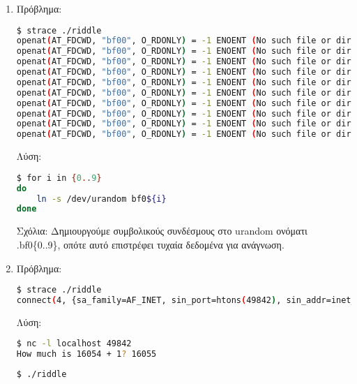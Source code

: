 \documentclass[12pt,titlepage]{article}
\newcommand{\en}{\textlatin}
\begin{document}
\begin{enumerate}
Σχόλια: Δημιουργούμε ένα σύνδεσμο στο αρχείο \en{.hello_there} ονόματι \en{.hey_there}.

\item

Πρόβλημα:

\latintext
\begin{lstlisting}[language=bash]
$ strace ./riddle
openat(AT_FDCWD, "bf00", O_RDONLY) = -1 ENOENT (No such file or directory)
openat(AT_FDCWD, "bf00", O_RDONLY) = -1 ENOENT (No such file or directory)
openat(AT_FDCWD, "bf00", O_RDONLY) = -1 ENOENT (No such file or directory)
openat(AT_FDCWD, "bf00", O_RDONLY) = -1 ENOENT (No such file or directory)
openat(AT_FDCWD, "bf00", O_RDONLY) = -1 ENOENT (No such file or directory)
openat(AT_FDCWD, "bf00", O_RDONLY) = -1 ENOENT (No such file or directory)
openat(AT_FDCWD, "bf00", O_RDONLY) = -1 ENOENT (No such file or directory)
openat(AT_FDCWD, "bf00", O_RDONLY) = -1 ENOENT (No such file or directory)
openat(AT_FDCWD, "bf00", O_RDONLY) = -1 ENOENT (No such file or directory)
openat(AT_FDCWD, "bf00", O_RDONLY) = -1 ENOENT (No such file or directory)
\end{lstlisting}
\greektext

Λύση:

\latintext
\begin{lstlisting}[language=bash]
$ for i in {0..9}
do
	ln -s /dev/urandom bf0${i}
done
\end{lstlisting}
\greektext

Σχόλια: Δημιουργούμε συμβολικούς συνδέσμους στο \en{urandom} ονόματι \en{.bf0\{0..9\}}, οπότε αυτό επιστρέφει τυχαία δεδομένα για ανάγνωση.

\item

Πρόβλημα:

\latintext
\begin{lstlisting}[language=bash]
$ strace ./riddle
connect(4, {sa_family=AF_INET, sin_port=htons(49842), sin_addr=inet_addr("127.0.0.1")}, 16) = -1 ECONNREFUSED (Connection refused)
\end{lstlisting}
\greektext

Λύση:

\latintext
\begin{lstlisting}[language=bash]
$ nc -l localhost 49842
How much is 16054 + 1? 16055
\end{lstlisting}
\greektext
\latintext
\begin{lstlisting}[language=bash]
$ ./riddle
\end{lstlisting}
\greektext


\end{enumerate}
\end{document}
